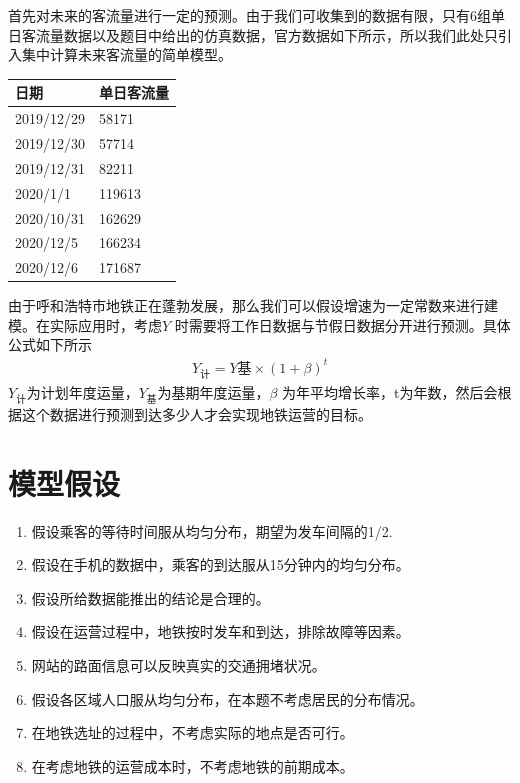\documentclass[12pt,a4paper]{mcmthesis}
\begin{document}
    首先对未来的客流量进行一定的预测。由于我们可收集到的数据有限，只有6组单日客流量数据以及题目中给出的仿真数据，官方数据如下所示，所以我们此处只引入集中计算未来客流量的简单模型。
    \begin{table}
        \centering
        \begin{tabular}{|l|l|}
            \hline
            日期         & 单日客流量  \\ \hline
            2019/12/29 & 58171  \\ \hline
            2019/12/30 & 57714  \\ \hline
            2019/12/31 & 82211  \\ \hline
            2020/1/1   & 119613 \\ \hline
            2020/10/31 & 162629 \\ \hline
            2020/12/5  & 166234 \\ \hline
            2020/12/6  & 171687 \\ \hline
        \end{tabular}
    \end{table}
    由于呼和浩特市地铁正在蓬勃发展，那么我们可以假设增速为一定常数来进行建模。在实际应用时，考虑$Y$ 时需要将工作日数据与节假日数据分开进行预测。具体公式如下所示
    \begin{equation}
        \begin{aligned}
            Y_{计}=Y{基} \times (1+\beta)^t
        \end{aligned}
    \end{equation}
    $Y_{计}$为计划年度运量，$Y_{基}$为基期年度运量，$\beta$ 为年平均增长率，t为年数，然后会根据这个数据进行预测到达多少人才会实现地铁运营的目标。


    \section{模型假设}

    \begin{enumerate}
        \item 假设乘客的等待时间服从均匀分布，期望为发车间隔的1/2.
        \item 假设在手机的数据中，乘客的到达服从15分钟内的均匀分布。
        \item 假设所给数据能推出的结论是合理的。
        \item 假设在运营过程中，地铁按时发车和到达，排除故障等因素。
        \item 网站的路面信息可以反映真实的交通拥堵状况。
        \item 假设各区域人口服从均匀分布，在本题不考虑居民的分布情况。
        \item 在地铁选址的过程中，不考虑实际的地点是否可行。
        \item 在考虑地铁的运营成本时，不考虑地铁的前期成本。

    \end{enumerate}
\end{document}

